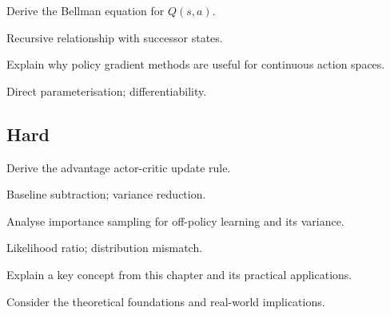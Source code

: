 \begin{exercisebox}[medium]
\begin{problem}
Derive the Bellman equation for $Q(s,a)$.
\end{problem}
\begin{hintbox}
Recursive relationship with successor states.
\end{hintbox}
\end{exercisebox}


\begin{exercisebox}[medium]
\begin{problem}
Explain why policy gradient methods are useful for continuous action spaces.
\end{problem}
\begin{hintbox}
Direct parameterisation; differentiability.
\end{hintbox}
\end{exercisebox}


\subsection*{Hard}

\begin{exercisebox}[hard]
\begin{problem}
Derive the advantage actor-critic update rule.
\end{problem}
\begin{hintbox}
Baseline subtraction; variance reduction.
\end{hintbox}
\end{exercisebox}


\begin{exercisebox}[hard]
\begin{problem}
Analyse importance sampling for off-policy learning and its variance.
\end{problem}
\begin{hintbox}
Likelihood ratio; distribution mismatch.
\end{hintbox}
\end{exercisebox}



\begin{exercisebox}[hard]
\begin{problem}
Explain a key concept from this chapter and its practical applications.
\end{problem}
\begin{hintbox}
Consider the theoretical foundations and real-world implications.
\end{hintbox}
\end{exercisebox}


